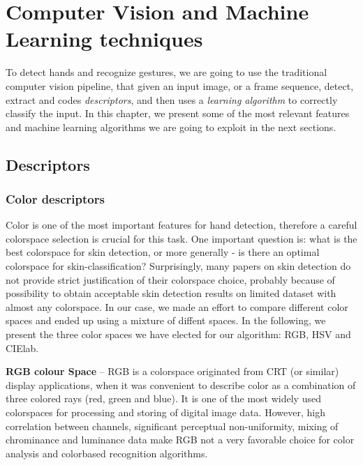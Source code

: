 
\chapter{Computer Vision and Machine Learning techniques}
\label{chpt2}

To detect hands and recognize gestures, we are going to use the traditional computer vision pipeline, that given an input image, or a frame sequence, detect, extract and codes \textit{descriptors}, and then uses a \textit{learning algorithm} to correctly classify the input. In this chapter, we present some of the most relevant features and machine learning algorithms we are going to exploit in the next sections.

\section{Descriptors}
\subsection{Color descriptors}
Color is one of the most important features for hand detection, therefore a careful colorspace selection is crucial for this task. One important question is: what is the best
colorspace for skin detection, or more generally - is there an optimal colorspace for skin-classification? Surprisingly, many papers on
skin detection do not provide strict justification of their colorspace choice, probably because of possibility to obtain acceptable skin
detection results on limited dataset with almost any colorspace. In our case, we made an effort to compare different color spaces and ended up using a mixture of diffent spaces. In the following, we present the three color spaces we have elected for our algorithm: RGB, HSV and CIElab.

\textbf{RGB colour Space} --  RGB is a colorspace originated from CRT (or similar) display applications, when it was convenient to describe color as a combination of three colored rays (red, green and blue). It is one of the most widely used colorspaces for processing and storing of digital image data. However, high correlation between channels, significant perceptual non-uniformity, mixing of chrominance and luminance data make RGB not a very favorable choice for color analysis and colorbased recognition algorithms.


